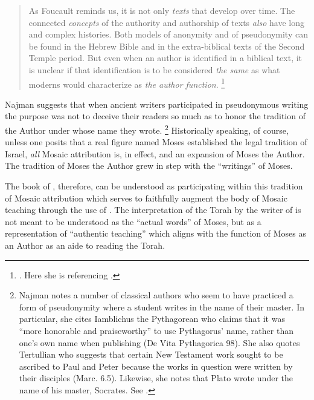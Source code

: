 \begin{quote}
    As Foucault reminds us, it is not only \emph{texts} that develop over time. The connected \emph{concepts} of the authority and authorship of texts \emph{also} have long and complex histories. Both models of anonymity and of pseudonymity can be found in the Hebrew Bible and in the extra-biblical texts of the Second Temple period. But even when an author is identified in a biblical text, it is unclear if that identification is to be considered \emph{the same} as what moderns would characterize as \emph{the author function}.%
        \footnote{%
            \cite[9--10]{najman2003}. Here she is referencing
            \cite[213]{foucault_essential-foucault_2}.}
\end{quote}
\noindent
Najman suggests that when ancient writers participated in pseudonymous writing the purpose was not to deceive their readers so much as to honor the tradition of the Author under whose name they wrote.%
    \footnote{Najman notes a number of classical authors who seem to have practiced a form of pseudonymity where a student writes in the name of their master. In particular, she cites Iamblichus the Pythagorean who claims that it was ``more honorable and praiseworthy'' to use Pythagorus' name, rather than one's own name when publishing (De Vita Pythagorica 98). She also quotes Tertullian who suggests that certain New Testament work sought to be ascribed to Paul and Peter because the works in question were written by their disciples (Marc. 6.5). Likewise, she notes that Plato wrote under the name of his master, Socrates. See \cite[13]{najman2003}.}
Historically speaking, of course, unless one posits that a real figure named Moses established the legal tradition of Israel, \emph{all} Mosaic attribution is, in effect, \psgraphical and an expansion of Moses the Author. The tradition of Moses the Author grew in step with the ``writings'' of Moses.

The book of \jub, therefore, can be understood as participating within this tradition of Mosaic attribution which serves to faithfully augment the body of Mosaic teaching through the use of \psy. The interpretation of the Torah by the writer of \jub is not meant to be understood as the ``actual words'' of Moses, but as a representation of ``authentic teaching'' which aligns with the function of Moses as an Author as an aide to reading the Torah.\autocite[13]{najman2003}




